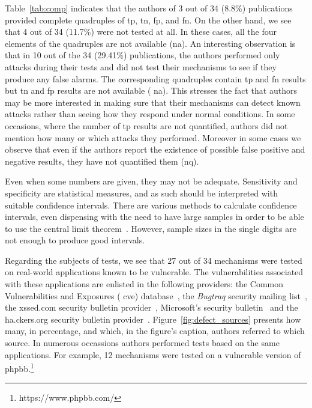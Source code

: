\documentclass[conference]{IEEEtran}
\begin{document}
Table~\ref{tab:comp} indicates that the authors of 3 out of 34 (8.8\%)
publications provided complete quadruples of {\sc tp}, {\sc tn}, 
{\sc fp}, and {\sc fn}. On the other hand, we
see that 4 out of 34 (11.7\%) were not tested at all. In these cases,
all the four elements of the quadruples are not available ({\sc na}).
An interesting observation is that in 10 out of the 34 (29.41\%)
publications, the authors performed only attacks during their tests
and did not test their mechanisms to see if they produce any false
alarms. The corresponding quadruples contain {\sc tp} and {\sc fn}
results but {\sc tn} and {\sc fp} results are not available ({\sc
  na}). This stresses the fact that authors may be more interested in
making sure that their mechanisms can detect known attacks rather than
seeing how they respond under normal conditions. In some occasions,
where the number of {\sc tp} results are not quantified, authors did
not mention how many or which attacks they performed. Moreover in some
cases we observe that even if the authors report the existence of
possible false positive and negative results, they have not quantified
them ({\sc nq}).

Even when some numbers are given, they may not be adequate.
Sensitivity and specificity are statistical measures, and as such
should be interpreted with suitable confidence intervals. There are
various methods to calculate confidence intervals, even dispensing
with the need to have large samples in order to be able to use the
central limit theorem~\cite{agresti1998,brown2001}. However, sample sizes in the single
digits are not enough to produce good intervals.

Regarding the subjects of tests, we see that 27 out of 34 mechanisms
were tested on real-world applications known to be vulnerable. The
vulnerabilities associated with these applications are enlisted in the
following providers: the Common Vulnerabilities and Exposures ({\sc
  cve}) database~\cite{cve}, the {\it Bugtraq} security
mailing list~\cite{bugtraq}, the {\sc xss}ed.com
security bulletin provider~\cite{xssed}, Microsoft's security
bulletin~\cite{microsoftBulletin} and the
ha.ckers.org security bulletin provider~\cite{hackers}.
Figure~\ref{fig:defect_sources} presents how many, in percentage,
and which, in the figure's caption, authors referred
to which source. In numerous occassions authors performed tests based
on the same applications. For example, 12 mechanisms were tested on a
vulnerable version of {\sc phpbb}.\footnote{https://www.phpbb.com/}
\end{document}
